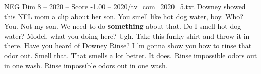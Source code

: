 \begin{textsample}{NEG Dim 8 – 2020 – Score -1.00 – 2020/tv\_com\_2020\_5.txt}  \label{ex:f8_neg_072}
Downey showed this NFL mom a clip about her son.
You smell like hot dog water, boy.
Who?
You.
Not my son.
We need to do \textbf{something} about that.
Do I smell hot dog water?
Model, what you doing here?
Ugh.
Take this funky shirt and throw it in there.
Have you heard of Downey Rinse?
I 'm gonna show you how to rinse that odor out.
Smell that.
That smells a lot better.
It does.
Rinse impossible odors out in one wash.
Rinse impossible odors out in one wash.

\end{textsample}
